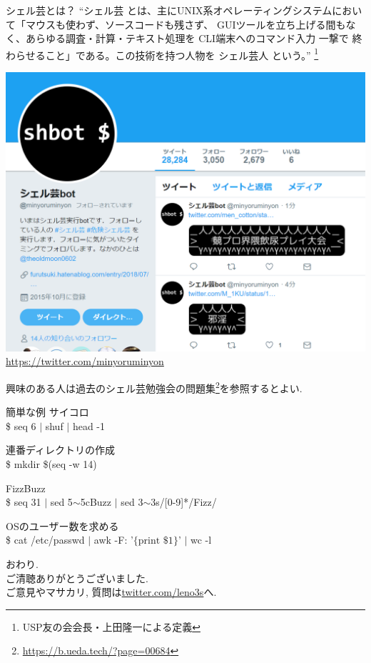 \documentclass[uplatex, dvipdfmx, unicode]{beamer}
\begin{document}
\begin{frame}{シェル芸とは？}
  ``シェル芸 とは、主にUNIX系オペレーティングシステムにおいて「マウスも使わず、ソースコードも残さず、
  GUIツールを立ち上げる間もなく、あらゆる調査・計算・テキスト処理を CLI端末へのコマンド入力 一撃で
  終わらせること」である。この技術を持つ人物を シェル芸人 という。''
  \footnote{USP友の会会長・上田隆一による定義}
\end{frame}

\begin{frame}
  \centering
  \includegraphics[keepaspectratio, scale=.5]{./img/shellgei.png}\\
  \url{https://twitter.com/minyoruminyon}
\end{frame}

\begin{frame}
  興味のある人は過去のシェル芸勉強会の問題集\footnote{\url{https://b.ueda.tech/?page=00684}}を参照するとよい.
\end{frame}

\begin{frame}{簡単な例}
  サイコロ \\
  \$ seq 6 $|$ shuf $|$ head -1 \\
  \vspace{0.2in}

  連番ディレクトリの作成 \\
  \$ mkdir \$(seq -w 14)
  \vspace{0.2in}
  
  FizzBuzz \\
  \$ seq 31 $|$ sed 5$\sim$5cBuzz $|$ sed 3$\sim$3s/[0-9]*/Fizz/
  \vspace{0.2in}

  OSのユーザー数を求める \\
  \$ cat /etc/passwd $|$ awk -F: '$\{\text{print \$1}\}$' $|$ wc -l
\end{frame}

\begin{frame}
  \centering
  \Large
  おわり. \\
  \normalsize
  ご清聴ありがとうございました. \\
  ご意見やマサカリ, 質問は\url{twitter.com/leno3s}へ.
\end{frame}
\end{document}
